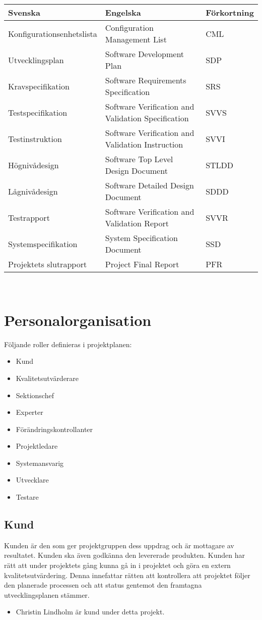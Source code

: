 \documentclass[paper=a4, fontsize=11pt,twoside]{article}
\begin{document}
\begin{tabular}{| l | l | l |}
\hline
\textbf{Svenska} & \textbf{Engelska} & \textbf{Förkortning} \\
\hline
\hline
 Konfigurationsenhetslista & Configuration Management List & CML \\
 \hline
Utvecklingsplan	 & Software Development Plan & SDP \\
\hline
Kravspecifikation & Software Requirements Specification & SRS \\
\hline
Testspecifikation & Software Verification and Validation Specification & SVVS \\
\hline
Testinstruktion & Software Verification and Validation Instruction & SVVI \\
\hline
Högnivådesign & Software Top Level Design Document & STLDD \\
\hline
Lågnivådesign & Software Detailed Design Document & SDDD \\
\hline
Testrapport & Software Verification and Validation Report & SVVR \\
\hline
Systemspecifikation & System Specification Document & SSD \\
\hline
Projektets slutrapport & Project Final Report & PFR \\
\hline
\end{tabular}\\

\section{Personalorganisation}
Följande roller definieras i projektplanen: 
\begin{itemize}
\item Kund
\item Kvalitetsutvärderare
\item Sektionschef
\item Experter
\item Förändringskontrollanter
\item Projektledare
\item Systemansvarig
\item Utvecklare
\item Testare
\end{itemize}

\subsection*{Kund}
Kunden är den som ger projektgruppen dess uppdrag och är mottagare av resultatet. Kunden ska även godkänna den levererade produkten. Kunden har rätt att under projektets gång kunna gå in i projektet och göra en extern kvalitetsutvärdering. Denna innefattar rätten att kontrollera att projektet följer den planerade processen och att status gentemot den framtagna utvecklingsplanen stämmer. 
\begin{itemize}
\item Christin Lindholm är kund under detta projekt. 
\end{itemize}
\end{document}
